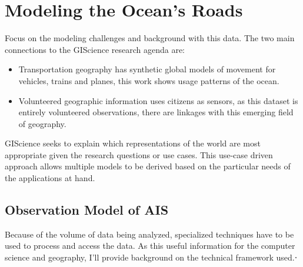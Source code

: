 \chapter{Modeling the Ocean's Roads}
\label{cha:gisci}


Focus on the modeling challenges and background with this data. The two main connections to the GIScience research agenda are:

\begin{itemize}
	\item Transportation geography has synthetic global models of movement for vehicles, trains and planes, this work shows usage patterns of the ocean.
	\item Volunteered geographic information uses citizens as sensors, as this dataset is entirely volunteered observations, there are linkages with this emerging field of geography.
\end{itemize}


GIScience seeks to explain which representations of the world are most appropriate given the research questions or use cases. This use-case driven approach allows multiple models to be derived based on the particular needs of the applications at hand. %

\section{Observation Model of AIS}

  Because of the volume of data being analyzed, specialized techniques have to be used to process and access the data. As this useful information for the computer science and geography, I'll provide background on the technical framework used.⋅

